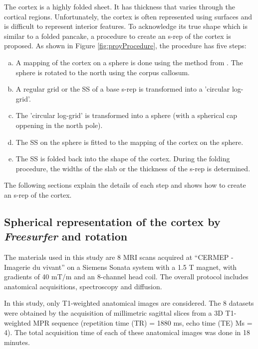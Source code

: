The cortex is a highly folded sheet. It has thickness that varies through the cortical regions. 
Unfortunately, the cortex is often represented using surfaces and is difficult to 
represent interior  features.
To acknowledge its true shape which is similar to a folded pancake, 
a procedure to create an s-rep of the cortex is proposed. 
As shown in Figure \ref{fig:proyProcedure}, the procedure has five steps:

\begin{enumerate}[(a)]
 \item A mapping of the cortex on a sphere is done using the method from \cite{fischl_cortical_1999}. 
       The sphere is rotated to the north using the corpus callosum.
 \item A regular grid or the SS of a base s-rep is transformed into a 'circular log-grid'.
 \item The 'circular log-grid' is transformed into a sphere (with a spherical cap oppening in the north pole).
 \item The SS on the sphere is fitted to the mapping of the cortex on the sphere.
 \item The SS is folded back into the shape of the cortex. During the folding procedure, the widths of the slab or the thickness of the s-rep is determined.        
\end{enumerate}

The following sections explain the details of each step and shows how to create an s-rep 
of the cortex.


\subsection{Spherical representation of the cortex by \textit{Freesurfer} and rotation}
\label{sec:Materials}

The materials used in this study are 8 
MRI scans acquired at ``CERMEP - Imagerie du vivant'' 
on a Siemens 
Sonata system with a 1.5 T magnet, with gradients of 40 mT/m and an 8-channel head coil. 
The overall protocol includes anatomical acquisitions, spectroscopy and diffusion.

In this study, only T1-weighted anatomical images are considered. The 8 datasets were obtained by
the acquisition of millimetric sagittal slices from a 3D T1-weighted MPR sequence (repetition time (TR) = 1880 ms, echo time (TE)
Ms = 4).
The total acquisition time of each of these anatomical images was done in 18 minutes.

